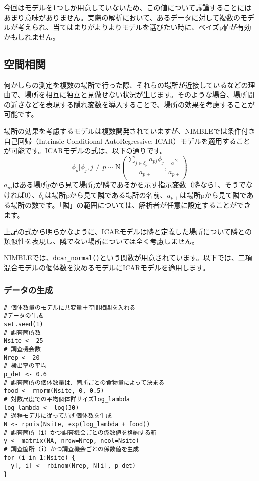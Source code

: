 今回はモデルを1つしか用意していないため、この値について議論することにはあまり意味がありません。実際の解析において、あるデータに対して複数のモデルが考えられ、当てはまりがよりよりモデルを選びたい時に、ベイズp値が有効かもしれません。

	\subsection{空間相関}
何かしらの測定を複数の場所で行った際、それらの場所が近接しているなどの理由で、場所を相互に独立と見做せない状況が生じます。そのような場合、場所間の近さなどを表現する隠れ変数を導入することで、場所の効果を考慮することが可能です。

場所の効果を考慮するモデルは複数開発されていますが、NIMBLEでは条件付き自己回帰（Intrinsic Conditional AutoRegressive; ICAR）モデルを適用することが可能です。ICARモデルの式は、以下の通りです。
\begin{equation}
\phi_{p} | \phi_{j}, j \neq p \sim \mathrm{N} \left( \dfrac{\sum_{j \in \delta_{p}} a_{pj} \phi_{j}}{a_{p+}}, \dfrac{\sigma^{2}}{a_{p+}} \right)
\end{equation}
$a_{pj}$はある場所$p$から見て場所$j$が隣であるかを示す指示変数（隣なら1、そうでなければ0）、$\delta_{p}$は場所pから見て隣である場所の名前、$a_{p+}$は場所pから見て隣である場所の数です。「隣」の範囲については、解析者が任意に設定することができます。

上記の式から明らかなように、ICARモデルは隣と定義した場所について隣との類似性を表現し、隣でない場所については全く考慮しません。

NIMBLEでは、\verb|dcar_normal()|という関数が用意されています。以下では、二項混合モデルの個体数を決めるモデルにICARモデルを適用します。
		\subsubsection{データの生成}
\begin{verbatim}
# 個体数量のモデルに共変量＋空間相関を入れる
#データの生成
set.seed(1)
# 調査箇所数
Nsite <- 25
# 調査機会数
Nrep <- 20
# 検出率の平均
p_det <- 0.6
# 調査箇所の個体数量は、箇所ごとの食物量によって決まる
food <- rnorm(Nsite, 0, 0.5)
# 対数尺度での平均個体群サイズlog_lambda
log_lambda <- log(30)
# 過程モデルに従って局所個体数を生成
N <- rpois(Nsite, exp(log_lambda + food))
# 調査箇所（i）かつ調査機会ごとの係数値を格納する箱
y <- matrix(NA, nrow=Nrep, ncol=Nsite)
# 調査箇所（i）かつ調査機会ごとの係数値を生成
for (i in 1:Nsite) {
  y[, i] <- rbinom(Nrep, N[i], p_det)
}
\end{verbatim}
